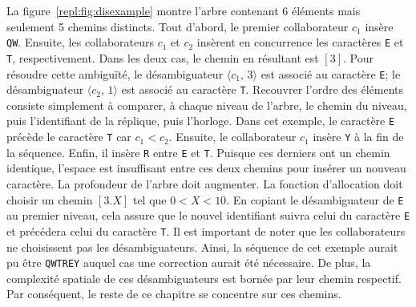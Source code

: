 La figure~\ref{repl:fig:disexample} montre l'arbre contenant 6 éléments mais
seulement 5 chemins distincts. Tout d'abord, le premier collaborateur $c_1$
insère \texttt{QW}. Ensuite, les collaborateurs $c_1$ et $c_2$ insèrent en
concurrence les caractères \texttt{E} et \texttt{T}, respectivement. Dans les
deux cas, le chemin en résultant est $[3]$. Pour résoudre cette ambiguïté, le
désambiguateur $\langle c_1,\, 3 \rangle$ est associé au caractère \texttt{E};
le désambiguateur $\langle c_2,\, 1 \rangle$ est associé au caractère
\texttt{T}. Recouvrer l'ordre des éléments consiste simplement à comparer, à
chaque niveau de l'arbre, le chemin du niveau, puis l'identifiant de la
réplique, puis l'horloge. Dans cet exemple, le caractère \texttt{E} précède le
caractère \texttt{T} car $c_1< c_2$. Ensuite, le collaborateur $c_1$ insère
\texttt{Y} à la fin de la séquence. Enfin, il insère \texttt{R} entre \texttt{E}
et \texttt{T}. Puisque ces derniers ont un chemin identique, l'espace est
insuffisant entre ces deux chemins pour insérer un nouveau caractère. La
profondeur de l'arbre doit augmenter. La fonction d'allocation doit choisir un
chemin $[3.X]$ tel que $0<X<10$. En copiant le désambiguateur de \texttt{E} au
premier niveau, cela assure que le nouvel identifiant suivra celui du caractère
\texttt{E} et précédera celui du caractère \texttt{T}. Il est important de noter
que les collaborateurs ne choisissent pas les désambiguateurs. Ainsi, la
séquence de cet exemple aurait pu être \texttt{QWTREY} auquel cas une correction
aurait été nécessaire. De plus, la complexité spatiale de ces désambiguateurs
est bornée par leur chemin respectif. Par conséquent, le reste de ce chapitre se
concentre sur ces chemins.


